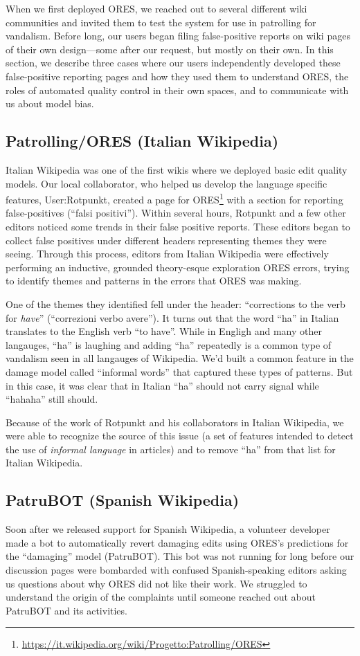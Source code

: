When we first deployed ORES, we reached out to several different wiki communities and invited them to test the system for use in patrolling for vandalism.  Before long, our users began filing false-positive reports on wiki pages of their own design---some after our request, but mostly on their own.  In this section, we describe three cases where our users independently developed these false-positive reporting pages and how they used them to understand ORES, the roles of automated quality control in their own spaces, and to communicate with us about model bias.

\subsection{Patrolling/ORES (Italian Wikipedia)}
Italian Wikipedia was one of the first wikis where we deployed basic edit quality models.  Our local collaborator, who helped us develop the language specific features, User:Rotpunkt, created a page for ORES\footnote{\url{https://it.wikipedia.org/wiki/Progetto:Patrolling/ORES}} with a section for reporting false-positives (``falsi positivi'').  Within several hours, Rotpunkt and a few other editors noticed some trends in their false positive reports.  These editors began to collect false positives under different headers representing themes they were seeing.  Through this process, editors from Italian Wikipedia were effectively performing an inductive, grounded theory-esque exploration ORES errors, trying to identify themes and patterns in the errors that ORES was making.

One of the themes they identified fell under the header: ``corrections to the verb for \emph{have}'' (``correzioni verbo avere'').  It turns out that the word ``ha'' in Italian translates to the English verb ``to have''.  While in Engligh and many other langauges, ``ha'' is laughing and adding ``ha'' repeatedly is a common type of vandalism seen in all langauges of Wikipedia.  We'd built a common feature in the damage model called ``informal words'' that captured these types of patterns.  But in this case, it was clear that in Italian ``ha'' should not carry signal while ``hahaha'' still should.

Because of the work of Rotpunkt and his collaborators in Italian Wikipedia, we were able to recognize the source of this issue (a set of features intended to detect the use of \emph{informal language} in articles) and to remove ``ha'' from that list for Italian Wikipedia.

\subsection{PatruBOT (Spanish Wikipedia)}
Soon after we released support for Spanish Wikipedia, a volunteer developer made a bot to automatically revert damaging edits using ORES's predictions for the ``damaging'' model (PatruBOT).  This bot was not running for long before our discussion pages were bombarded with confused Spanish-speaking editors asking us questions about why ORES did not like their work.  We struggled to understand the origin of the complaints until someone reached out about PatruBOT and its activities.


